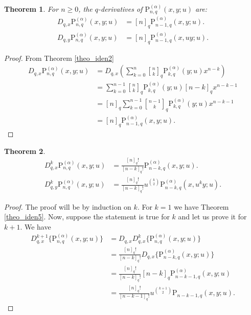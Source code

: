 \documentclass[12pt]{article}
\newcommand{\qbinom}{\genfrac{[}{]}{0pt}{}}
\newcommand{\p}{\mathrm{P}}
\newtheorem{theorem}{Theorem}
\begin{document}
\begin{theorem}\label{theo_iden6}
For $n\geq0$, the $q$-derivatives of $\p_{n,q}^{(\alpha)}(x,y;u)$ are:
    \begin{align}
        D_{q,x}\p_{n,q}^{(\alpha)}(x,y;u)&=[n]_{q}\p_{n-1,q}^{(\alpha)}(x,y;u).\\
        D_{q,y}\p_{n,q}^{(\alpha)}(x,y;u)&=[n]_{q}\p_{n-1,q}^{(\alpha)}(x,uy;u).
    \end{align}
\end{theorem}
\begin{proof}
From Theorem \ref{theo_iden2}
    \begin{align*}
        D_{q,x}\p_{n,q}^{(\alpha)}(x,y;u)&=D_{q,x}\left(\sum_{k=0}^{n}\qbinom{n}{k}_{q}\p_{k,q}^{(\alpha)}(y;u)x^{n-k}\right)\\
        &=\sum_{k=0}^{n-1}\qbinom{n}{k}_{q}\p_{k,q}^{(\alpha)}(y;u)[n-k]_{q}x^{n-k-1}\\
        &=[n]_{q}\sum_{k=0}^{n-1}\qbinom{n-1}{k}_{q}\p_{k,q}^{(\alpha)}(y;u)x^{n-k-1}\\
        &=[n]_{q}\p_{n-1,q}^{(\alpha)}(x,y;u).
    \end{align*}
\end{proof}

\begin{theorem}\label{theo_iden7}
    \begin{align}
        D_{q,x}^{k}\p_{n,q}^{(\alpha)}(x,y;u)&=\frac{[n]_{q}!}{[n-k]_{q}!}\p_{n-k,q}^{(\alpha)}(x,y;u).\\
        D_{q,y}^{k}\p_{n,q}^{(\alpha)}(x,y;u)&=\frac{[n]_{q}!}{[n-k]_{q}!}u^{\binom{k}{2}}\p_{n-k,q}^{(\alpha)}(x,u^{k}y;u).
    \end{align}
\end{theorem}
\begin{proof}
The proof will be by induction on $k$. For $k=1$ we have Theorem \ref{theo_iden5}. Now, suppose the statement is true for $k$ and let us prove it for $k+1$. We have
\begin{align*}
    D_{q,x}^{k+1}\{\p_{n,q}^{(\alpha)}(x,y;u)\}&=D_{q,x}D_{q,x}^{k}\{\p_{n,q}^{(\alpha)}(x,y;u)\}\\
    &=\frac{[n]_{q}!}{[n-k]_{q}!}D_{q,x}\{\p_{n-k,q}^{(\alpha)}(x,y;u)\}\\
    &=\frac{[n]_{q}!}{[n-k]_{q}!}[n-k]_{q}\p_{n-k-1,q}^{(\alpha)}(x,y;u)\\
    &=\frac{[n]_{q}!}{[n-k-1]_{q}!}u^{\binom{k+1}{2}}\p_{n-k-1,q}(x,y;u).
\end{align*}
\end{proof}
\end{document}
